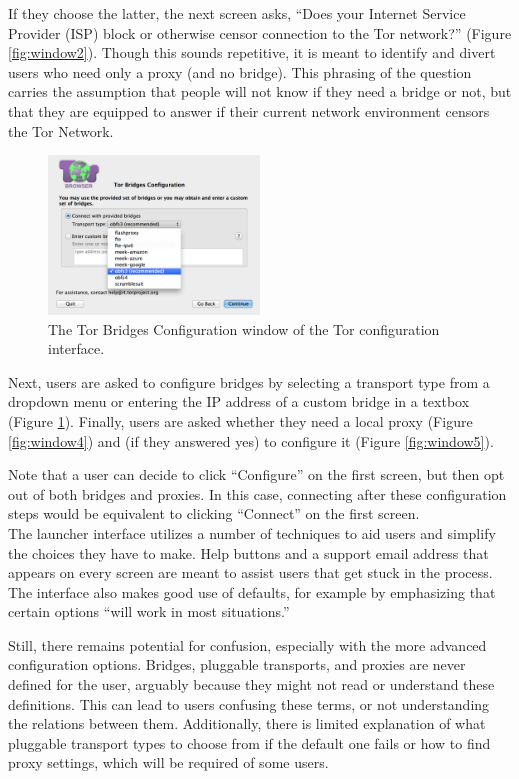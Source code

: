 \documentclass{template}
\begin{document}
If they choose the latter, the next screen asks, ``Does your Internet Service
Provider (ISP) block or otherwise censor connection to the Tor network?''
(Figure \ref{fig:window2}). Though this sounds repetitive, it is meant to
identify and divert users who need only a proxy (and no bridge).
This phrasing of the question carries the assumption that people will
not know if they need a bridge or not, but that they are equipped to answer if their
current network environment censors the Tor Network. 

\begin{figure}[h]
  \centering
    \includegraphics[width=0.5\textwidth]{configuration-screenshot.png}
    \caption{The Tor Bridges Configuration window of the Tor configuration
    interface.}
\label{fig:bridges}
\end{figure}

Next, users are asked to configure bridges by selecting a transport type from a
dropdown menu or entering the IP address of a custom bridge in a textbox (Figure
\ref{fig:bridges}).
Finally, users are asked whether they need a local proxy (Figure
\ref{fig:window4}) and (if they answered yes) to configure it (Figure
\ref{fig:window5}).

Note that a user can decide to click ``Configure'' on the first screen, but then
opt out of both bridges and proxies.
In this case, connecting after these configuration steps
would be equivalent to clicking ``Connect'' on the first screen. \\ 

The launcher interface utilizes a number of techniques to aid users and simplify
the choices they have to make. Help buttons and a support email address that
appears on every screen are meant to assist users that get stuck in the process.
The interface also makes good use of defaults, for example by emphasizing that
certain options ``will work in most situations.''

Still, there remains potential for confusion, especially with the more advanced
configuration options.
Bridges, pluggable transports, and proxies are never defined for the user,
arguably because they might not read or understand these definitions.
This can lead to users confusing these terms, or not understanding
the relations between them. Additionally, there is limited explanation of 
what pluggable transport types to choose from if the default one fails or how to 
find proxy settings, which will be required of some users. 
\end{document}
